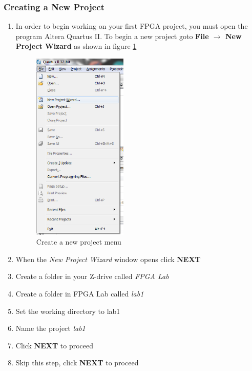 \subsubsection{Creating a New Project}
\begin{enumerate}
	\item In order to begin working on your first FPGA project, you must open the program Altera Quartus II. To begin a new project goto  {\bf File $\rightarrow$ New Project Wizard} as shown in figure \ref{fig:step1}

	\begin{figure}[H]
		\centering
		\includegraphics[width=45mm]{Lab1/figures/step1.png}
		\caption{Create a new project menu}
		\label{fig:step1}
	\end{figure}

	\item When the \emph{New Project Wizard} window opens click {\bf NEXT}

	\item Create a folder in your Z-drive called \emph{FPGA Lab}

	\item Create a folder in FPGA Lab called \emph{lab1}

	\item Set the working directory to lab1

	\item Name the project \emph{lab1}

	\item Click {\bf NEXT} to proceed

	\item Skip this step, click  {\bf NEXT} to proceed


\end{enumerate}
